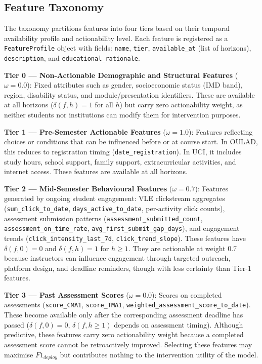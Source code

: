 \documentclass[a4paper,fleqn]{cas-sc}
\begin{document}
\subsection{Feature Taxonomy}

The taxonomy partitions features into four tiers based on their temporal availability profile and actionability level. Each feature is registered as a \texttt{FeatureProfile} object with fields: \texttt{name}, \texttt{tier}, \texttt{available\_at} (list of horizons), \texttt{description}, and \texttt{educational\_rationale}.

\textbf{Tier 0 --- Non-Actionable Demographic and Structural Features} ($\omega = 0.0$): Fixed attributes such as gender, socioeconomic status (IMD band), region, disability status, and module/presentation identifiers. These are available at all horizons ($\delta(f, h) = 1$ for all $h$) but carry zero actionability weight, as neither students nor institutions can modify them for intervention purposes.

\textbf{Tier 1 --- Pre-Semester Actionable Features} ($\omega = 1.0$): Features reflecting choices or conditions that can be influenced before or at course start. In OULAD, this reduces to registration timing (\texttt{date\_registration}). In UCI, it includes study hours, school support, family support, extracurricular activities, and internet access. These features are available at all horizons.

\textbf{Tier 2 --- Mid-Semester Behavioural Features} ($\omega = 0.7$): Features generated by ongoing student engagement: VLE clickstream aggregates (\texttt{sum\_click\_to\_date}, \texttt{days\_active\_to\_date}, per-activity click counts), assessment submission patterns (\texttt{assessment\_submitted\_count}, \texttt{assessment\_on\_time\_rate}, \texttt{avg\_first\_submit\_gap\_days}), and engagement trends (\texttt{click\_intensity\_last\_7d}, \texttt{click\_trend\_slope}). These features have $\delta(f, 0) = 0$ and $\delta(f, h) = 1$ for $h \geq 1$. They are actionable at weight 0.7 because instructors can influence engagement through targeted outreach, platform design, and deadline reminders, though with less certainty than Tier-1 features.

\textbf{Tier 3 --- Past Assessment Scores} ($\omega = 0.0$): Scores on completed assessments (\texttt{score\_CMA1}, \texttt{score\_TMA1}, \texttt{weighted\_assessment\_score\_to\_date}). These become available only after the corresponding assessment deadline has passed ($\delta(f, 0) = 0$, $\delta(f, h \geq 1)$ depends on assessment timing). Although predictive, these features carry zero actionability weight because a completed assessment score cannot be retroactively improved. Selecting these features may maximise $F1_{deploy}$ but contributes nothing to the intervention utility of the model.
\end{document}
